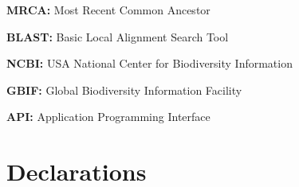 \documentclass{bmcart}
\begin{document}
\textbf{MRCA:} Most Recent Common Ancestor

\textbf{BLAST:} Basic Local Alignment Search Tool

\textbf{NCBI:} USA National Center for Biodiversity Information

\textbf{GBIF:} Global Biodiversity Information Facility

\textbf{API:} Application Programming Interface

\section*{Declarations}
\end{document}
